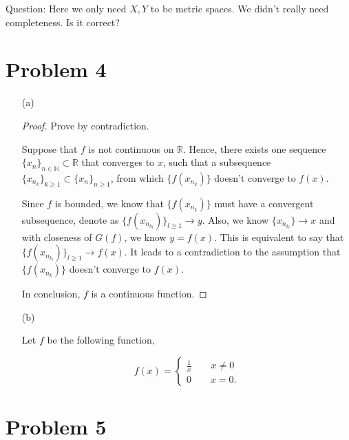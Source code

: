 \documentclass[12pt]{article}
\begin{document}
{\color{red}Question:} Here we only need $X, Y$ to be metric spaces. We didn't really need completeness. Is it correct?


\section*{Problem 4}

\begin{enumerate}

\item [(a)]

\begin{proof}
Prove by contradiction.

Suppose that $f$ is not continuous on $\mathbb R$. Hence, there exists one sequence $\{x_n\}_{n\in\mathbb N}\subset \mathbb R$ that converges to $x$, such that a subsequence $\{x_{n_k}\}_{k\geqslant 1} \subset \{x_n\}_{n\geqslant 1}$, from which $\{f(x_{n_k})\}$ doesn't converge to $f(x)$. 

Since $f$ is bounded, we know that $\{f(x_{n_k})\}$ must have a convergent subsequence, denote as $\{f(x_{n_{k_l}})\}_{l\geqslant 1} \rightarrow y$. Also, we know $\{x_{n_{k_l}}\} \rightarrow x$ and with closeness of $G(f)$, we know $y = f(x)$. This is equivalent to say that  $\{f(x_{n_{k_l}})\}_{l\geqslant 1} \rightarrow f(x)$. It leads to a contradiction to the assumption that $\{f(x_{n_k})\}$ doesn't converge to $f(x)$.

In conclusion, $f$ is a continuous function.

\end{proof}

\item [(b)]

Let $f$ be the following function,

$$
f(x) = \left\{
\begin{aligned}
\frac{1}{x}\qquad x \neq 0\\
0 \qquad x = 0.
\end{aligned}
\right.
$$

\end{enumerate}



\section*{Problem 5}
\end{document}
